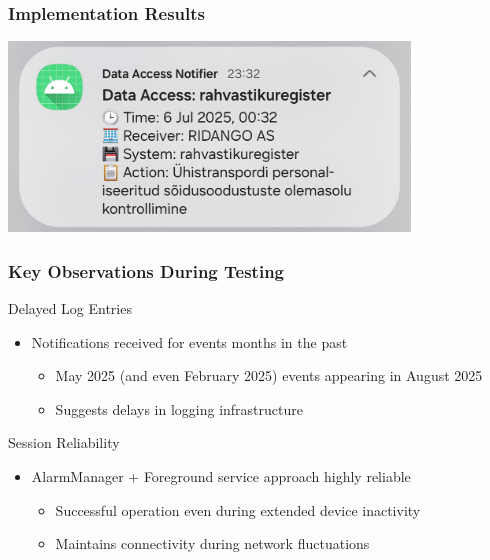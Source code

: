 \documentclass[aspectratio=169,11pt]{beamer}
\begin{document}
\begin{frame}
\frametitle{Implementation Results}
\begin{center}
\includegraphics[width=0.8\textwidth]{../english/figures/IMG_20250812_233325_272.jpg}
\end{center}
\end{frame}

\begin{frame}
\frametitle{Key Observations During Testing}
\begin{block}{Delayed Log Entries}
\begin{itemize}
    \item Notifications received for events months in the past
    \begin{itemize}
        \item May 2025 (and even February 2025) events appearing in August 2025
        \item Suggests delays in logging infrastructure
    \end{itemize}
\end{itemize}
\end{block}

\begin{block}{Session Reliability}
\begin{itemize}
    \item AlarmManager + Foreground service approach highly reliable
    \begin{itemize}
        \item Successful operation even during extended device inactivity
        \item Maintains connectivity during network fluctuations
    \end{itemize}
\end{itemize}
\end{block}

\end{frame}
\end{document}
